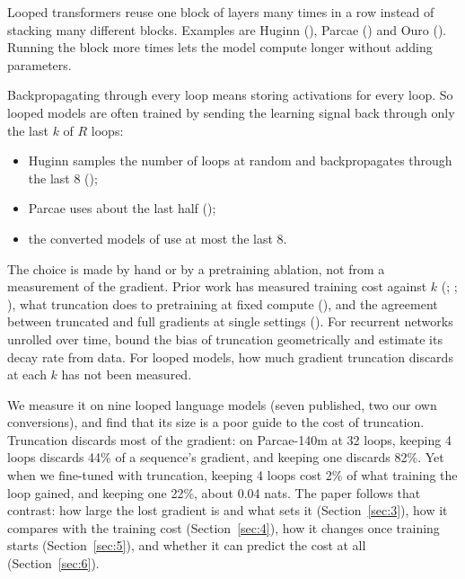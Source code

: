 \documentclass[10pt]{article}
\begin{document}
Looped transformers reuse one block of layers many times in a row instead of stacking many different blocks. Examples are Huginn (\citealp{geiping2025}), Parcae (\citealp{prairie2026parcae}) and Ouro (\citealp{zhu2025ouro}). Running the block more times lets the model compute longer without adding parameters.

Backpropagating through every loop means storing activations for every loop. So looped models are often trained by sending the learning signal back through only the last $k$ of $R$ loops:

\begin{itemize}
\item Huginn samples the number of loops at random and backpropagates through the last 8 (\citealp[Sec.~3.3]{geiping2025});
\item Parcae uses about the last half (\citealp[Sec.~4.2]{prairie2026parcae});
\item the converted models of \citet{mcleish2025} use at most the last 8.
\end{itemize}

The choice is made by hand or by a pretraining ablation, not from a measurement of the gradient. Prior work has measured training cost against $k$ (\citealp[App.~I]{prairie2026parcae}; \citealp{huang2026partii}; \citealp{xiong2026truncate}), what truncation does to pretraining at fixed compute (\citealp{schwethelm2026a}), and the agreement between truncated and full gradients at single settings (\citealp[App.~C.3 and C.8]{huang2026partii}). For recurrent networks unrolled over time, \citet{aicher2019} bound the bias of truncation geometrically and estimate its decay rate from data. For looped models, how much gradient truncation discards at each $k$ has not been measured.

We measure it on nine looped language models (seven published, two our own conversions), and find that its size is a poor guide to the cost of truncation. Truncation discards most of the gradient: on Parcae-140m at 32 loops, keeping 4 loops discards 44\% of a sequence's gradient, and keeping one discards 82\%. Yet when we fine-tuned with truncation, keeping 4 loops cost 2\% of what training the loop gained, and keeping one 22\%, about 0.04 nats. The paper follows that contrast: how large the lost gradient is and what sets it (Section~\ref{sec:3}), how it compares with the training cost (Section~\ref{sec:4}), how it changes once training starts (Section~\ref{sec:5}), and whether it can predict the cost at all (Section~\ref{sec:6}).
\end{document}
